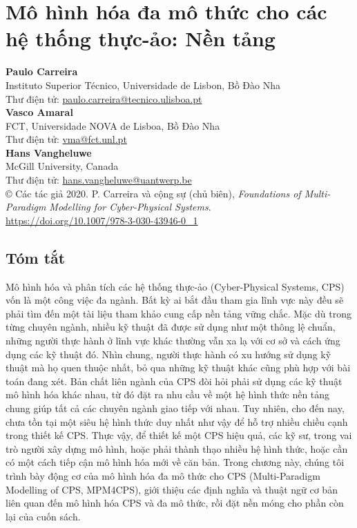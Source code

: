 \chapter{Mô hình hóa đa mô thức cho các hệ thống thực-ảo: Nền tảng}

\begin{flushleft}
\small
\textbf{Paulo Carreira}\\
Instituto Superior Técnico, Universidade de Lisbon, Bồ Đào Nha\\
Thư điện tử: \url{paulo.carreira@tecnico.ulisboa.pt}\\[0.5em]
\textbf{Vasco Amaral}\\
FCT, Universidade NOVA de Lisboa, Bồ Đào Nha\\
Thư điện tử: \url{vma@fct.unl.pt}\\[0.5em]
\textbf{Hans Vangheluwe}\\
McGill University, Canada\\
Thư điện tử: \url{hans.vangheluwe@uantwerp.be}\\[0.5em]
\copyright{} Các tác giả 2020. P. Carreira và cộng sự (chủ biên), \emph{Foundations of Multi-Paradigm Modelling for Cyber-Physical Systems}.\\
\url{https://doi.org/10.1007/978-3-030-43946-0_1}
\end{flushleft}

\section*{Tóm tắt}
Mô hình hóa và phân tích các hệ thống thực-ảo (Cyber-Physical Systems, CPS) vốn là một công việc đa ngành. Bất kỳ ai bắt đầu tham gia lĩnh vực này đều sẽ phải tìm đến một tài liệu tham khảo cung cấp nền tảng vững chắc. Mặc dù trong từng chuyên ngành, nhiều kỹ thuật đã được sử dụng như một thông lệ chuẩn, những người thực hành ở lĩnh vực khác thường vẫn xa lạ với cơ sở và cách ứng dụng các kỹ thuật đó. Nhìn chung, người thực hành có xu hướng sử dụng kỹ thuật mà họ quen thuộc nhất, bỏ qua những kỹ thuật khác cũng phù hợp với bài toán đang xét. Bản chất liên ngành của CPS đòi hỏi phải sử dụng các kỹ thuật mô hình hóa khác nhau, từ đó đặt ra nhu cầu về một hệ hình thức nền tảng chung giúp tất cả các chuyên ngành giao tiếp với nhau. Tuy nhiên, cho đến nay, chưa tồn tại một siêu hệ hình thức duy nhất như vậy để hỗ trợ nhiều chiều cạnh trong thiết kế CPS. Thực vậy, để thiết kế một CPS hiệu quả, các kỹ sư, trong vai trò người xây dựng mô hình, hoặc phải thành thạo nhiều hệ hình thức, hoặc cần có một cách tiếp cận mô hình hóa mới về căn bản. Trong chương này, chúng tôi trình bày động cơ của mô hình hóa đa mô thức cho CPS (Multi-Paradigm Modelling of CPS, MPM4CPS), giới thiệu các định nghĩa và thuật ngữ cơ bản liên quan đến mô hình hóa CPS và đa mô thức, rồi đặt nền móng cho phần còn lại của cuốn sách.

